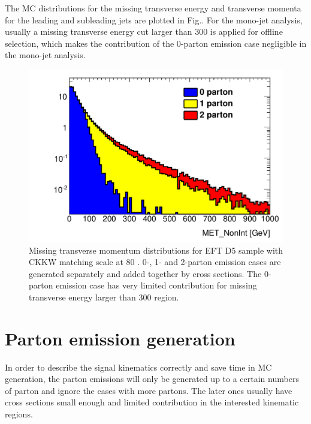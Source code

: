 The MC distributions for the missing transverse energy and transverse momenta for the leading and subleading jets are plotted in Fig.. For the mono-jet analysis, usually a missing transverse energy cut larger than 300 \gev is applied for offline selection, which makes the contribution of the 0-parton emission case negligible in the mono-jet analysis.

\begin{figure}[h!]
	\centering  
    \includegraphics[width=0.8\linewidth]{figures/monojet_appendix/MET_matching80.pdf}
	\caption{Missing transverse momentum distributions for EFT D5 sample with CKKW matching scale at 80 \gev. 0-, 1- and 2-parton emission cases are generated separately and added together by cross sections. The 0-parton emission case has very limited contribution for missing transverse energy larger than 300 \gev region.}
	\label{fig:Kine_D5_80}
\end{figure}


\section{Parton emission generation}
\label{sec:monojet_parton_emission}
In order to describe the signal kinematics correctly and save time in MC generation, the parton emissions will only be generated up to a certain numbers of parton and ignore the cases with more partons. The later ones usually have cross sections small enough and limited contribution in the interested kinematic regions.

